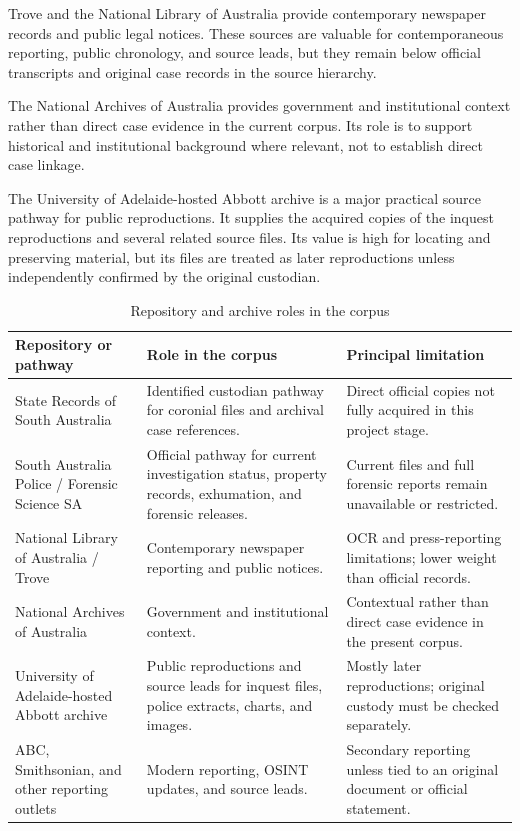 Trove and the National Library of Australia provide contemporary newspaper records and public legal notices. These sources are valuable for contemporaneous reporting, public chronology, and source leads, but they remain below official transcripts and original case records in the source hierarchy.

The National Archives of Australia provides government and institutional context rather than direct case evidence in the current corpus. Its role is to support historical and institutional background where relevant, not to establish direct case linkage.

The University of Adelaide-hosted Abbott archive is a major practical source pathway for public reproductions. It supplies the acquired copies of the inquest reproductions and several related source files. Its value is high for locating and preserving material, but its files are treated as later reproductions unless independently confirmed by the original custodian.

\begin{table}[htbp]
\centering
\caption{Repository and archive roles in the corpus}
\label{tab:sources-archive-summary}
\begin{tabularx}{\textwidth}{p{}X p{}}
\toprule
Repository or pathway & Role in the corpus & Principal limitation \\
\midrule
State Records of South Australia & Identified custodian pathway for coronial files and archival case references. & Direct official copies not fully acquired in this project stage. \\
South Australia Police / Forensic Science SA & Official pathway for current investigation status, property records, exhumation, and forensic releases. & Current files and full forensic reports remain unavailable or restricted. \\
National Library of Australia / Trove & Contemporary newspaper reporting and public notices. & OCR and press-reporting limitations; lower weight than official records. \\
National Archives of Australia & Government and institutional context. & Contextual rather than direct case evidence in the present corpus. \\
University of Adelaide-hosted Abbott archive & Public reproductions and source leads for inquest files, police extracts, charts, and images. & Mostly later reproductions; original custody must be checked separately. \\
ABC, Smithsonian, and other reporting outlets & Modern reporting, OSINT updates, and source leads. & Secondary reporting unless tied to an original document or official statement. \\
\bottomrule
\end{tabularx}
\end{table}


